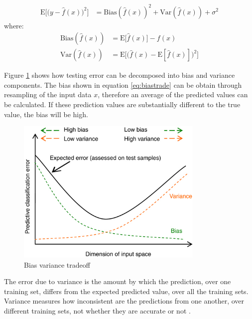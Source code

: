 \begin{align}
\label{eq:bvtrade}
\mathrm{E}\Big[\big(y - \hat{f}(x)\big)^2\Big]
 & = \mathrm{Bias}(\hat{f}(x))^2 + \mathrm{Var}(\hat{f}(x)) + \sigma^2
\end{align}
\noindent where:
\begin{align}
 \mathrm{Bias}(\hat{f}(x)) &= \mathrm{E}\big[\hat{f}(x)\big] - f(x) \label{eq:biastrade}\\
 \mathrm{Var}(\hat{f}(x)) &= \mathrm{E}\Big[ \big( \hat{f}(x) - \mathrm{E}[\hat{f}(x)] \big)^2 \Big]  \label{eq:variancetrade}
\end{align}


Figure \ref{fig:bvtradeoff} shows how
testing error can be decomposed into bias and variance components. 
The bias shown in equation \ref{eq:biastrade} can be obtain through resampling
of the input data $x$, therefore an average of the predicted values can be
calculated. If these prediction values are substantially different to the true
value, the bias will be high.

\begin{figure}[!h]
  \centering
  \includegraphics[width=0.8\textwidth]{img/biasvariancetradeoff}
  \caption{Bias variance tradeoff}
  \label{fig:bvtradeoff}
\end{figure}

The error due to variance is the amount by which the prediction, over one
training set, differs from the expected predicted value, over all the training
sets. Variance measures how inconsistent are the predictions from one another,
over different training sets, not whether they are accurate or not
\cite{gutierrez2015machine}.


